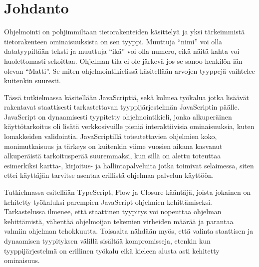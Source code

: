 \chapter{Johdanto} \label{Johdanto}

Ohjelmointi on pohjimmiltaan tietorakenteiden käsittelyä ja yksi tärkeimmistä
tietorakenteen ominaisuuksista on sen tyyppi. Muuttuja “nimi” voi olla
datatyypiltään teksti ja muuttuja “ikä” voi olla numero, eikä näitä kahta voi
huolettomasti sekoittaa. Ohjelman tila ei ole järkevä jos se sanoo henkilön
iän olevan “Matti”. Se miten ohjelmointikielissä käsitellään arvojen tyyppejä
vaihtelee kuitenkin suuresti.

Tässä tutkielmassa käsitellään JavaScriptiä, sekä kolmea työkalua jotka
lisäävät rakentavat staattisesti tarkastettavan tyyppijärjestelmän
JavaScriptin päälle. JavaScript on dynaamisesti tyypitetty ohjelmointikieli,
jonka alkuperäinen käyttötarkoitus oli lisätä verkkosivuille pieniä
interaktiivisia ominaisuuksia, kuten lomakkeiden validointia. JavaScriptillä
toteutettavien ohjelmien koko, monimutkaisuus ja tärkeys on kuitenkin viime
vuosien aikana kasvanut alkuperäistä tarkoitusperää suuremmaksi, kun sillä on
alettu toteuttaa esimerkiksi kartta-, kirjoitus- ja hallintapalveluita jotka
toimivat selaimessa, siten ettei käyttäjän tarvitse asentaa erillistä
ohjelmaa palvelun käyttöön.

Tutkielmassa esitellään TypeScript, Flow ja Closure-kääntäjä, joista jokainen on
kehitetty työkaluksi parempien JavaScript-ohjelmien kehittämiseksi.
Tarkastelussa ilmenee, että staattinen tyypitys voi nopeuttaa ohjelman
kehittämistä, vähentää ohjelmoijan tekemien virheiden määrää ja parantaa
valmiin ohjelman tehokkuutta. Toisaalta nähdään myös, että valinta staattisen
ja dynaamisen tyypityksen välillä sisältää kompromisseja, etenkin kun
tyyppijärjestelmä on erillinen työkalu eikä kieleen alusta asti kehitetty
ominaisuus.
